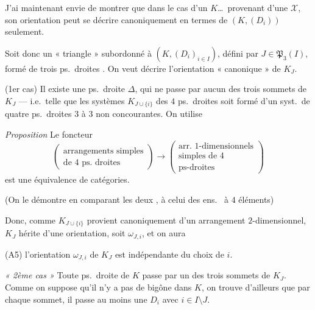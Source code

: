 \documentclass[11pt,a4paper]{article}
\begin{document}
J'ai maintenant envie de montrer que dans le cas d'un $K$\ldots\ provenant d'une $\mathcal{X}$, son orientation peut se décrire canoniquement en termes de $(K, (D_i))$ seulement.

Soit donc un « triangle » subordonné à $(K, (D_i)_{i \in I})$, \struck{\ill{}} défini par $J \in \mathfrak{P}_3(I)$, formé de trois ps.\ droites . On veut décrire \struck{\ill{}} l'orientation « canonique » de $K_J$.

(1er cas) Il existe une \struck{\ill{}} ps.\ droite $\Delta$, qui ne passe par aucun des trois sommets de $K_J$ --- i.e.\ telle que les systèmes $K_{J \cup \lbrace i \rbrace}$ des $4$ ps.\ droites soit formé d'un syst.\ de quatre ps.\ droites $3$ à $3$ non concourantes. On utilise

\emph{Proposition} Le  foncteur \struck{\ill{} \ill{}} 
\[
\begin{pmatrix} \text{arrangements simples} \\ \text{de } 4 \text{ ps.\ droites} \end{pmatrix}
\longrightarrow
\begin{pmatrix} \text{arr.\ } 1\text{-dimensionnels} \\ \text{simples de } 4 \\ \text{ps-droites} \end{pmatrix}
\]
est une équivalence de catégories.

(On le démontre en comparant les deux , à celui des ens.\  à $4$ éléments)

Donc, comme $K_{J \cup \lbrace i \rbrace}$ provient canoniquement d'un arrangement $2$-dimensionnel, $K_J$ hérite d'une orientation, soit $\omega_{J,i}$, et on aura

(A5) l'orientation $\omega_{J,i}$ de $K_J$ est indépendante du choix de $i$.

\emph{« 2ème cas »} Toute ps.\ droite de $K$ passe par un des trois sommets de $K_J$.
Comme on suppose qu'il n'y a pas de bigône dans $K$, on trouve d'ailleurs que par chaque sommet, il passe au moins une $D_i$ avec $i \in I \setminus J$.
\end{document}
